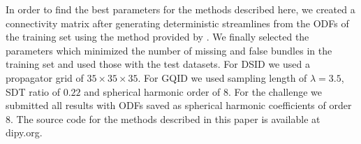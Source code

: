 \documentclass[9pt,conference,a4paper]{IEEEtran}
\begin{document}
In order to find the best parameters for the methods described here, we created a connectivity matrix after generating deterministic streamlines from the ODFs of the training set using the method provided by \cite{Girard2012a}. We finally selected the parameters which minimized the number of missing and false bundles in the training set and used those with the test datasets. For DSID we used a propagator grid of $35\times35\times35$. For GQID we used sampling length of $\lambda=3.5$, SDT ratio of $0.22$ and spherical harmonic order of 8. For the challenge we submitted all results with ODFs saved as spherical harmonic coefficients of order 8. The source code for the methods described in this paper is available at dipy.org.


\end{document}
